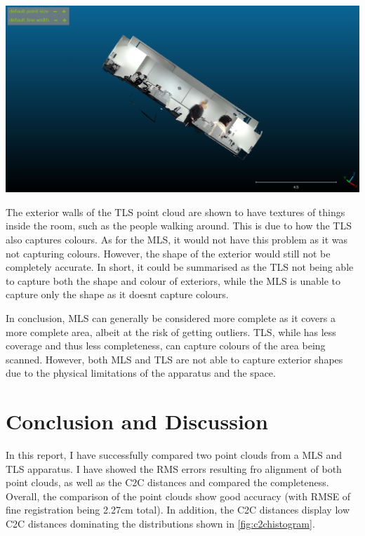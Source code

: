 \documentclass[man]{apa7}
\begin{document}
\begin{minipage}{\linewidth}
  \includegraphics[height=\textheight/4 ,width=\textwidth/2]{figures/exteriorTLS.png}
  \label{fig:exteriorArea}
\end{minipage}

The exterior walls of the TLS point cloud are shown to have textures of things inside the room, such as the people walking around. This is due to how the TLS also captures colours. As for the MLS, it would not have this problem as it was not capturing colours. However, the shape of the exterior would still not be completely accurate. In short, it could be summarised as the TLS not being able to capture both the shape and colour of exteriors, while the MLS is unable to capture only the shape as it doesnt capture colours. 

In conclusion, MLS can generally be considered more complete as it covers a more complete area, albeit at the risk of getting outliers. TLS, while has less coverage and thus less completeness, can capture colours of the area being scanned. However, both MLS and TLS are not able to capture exterior shapes due to the physical limitations of the apparatus and the space.

\section{Conclusion and Discussion}

In this report, I have successfully compared two point clouds from a MLS and TLS apparatus. I have showed the RMS errors resulting fro alignment of both point clouds, as well as the C2C distances and compared the completeness. Overall, the comparison of the point clouds show good accuracy (with RMSE of fine registration being 2.27cm total). In addition, the C2C distances display low C2C distances dominating the distributions shown in \ref{fig:c2chistogram}. 
\end{document}
